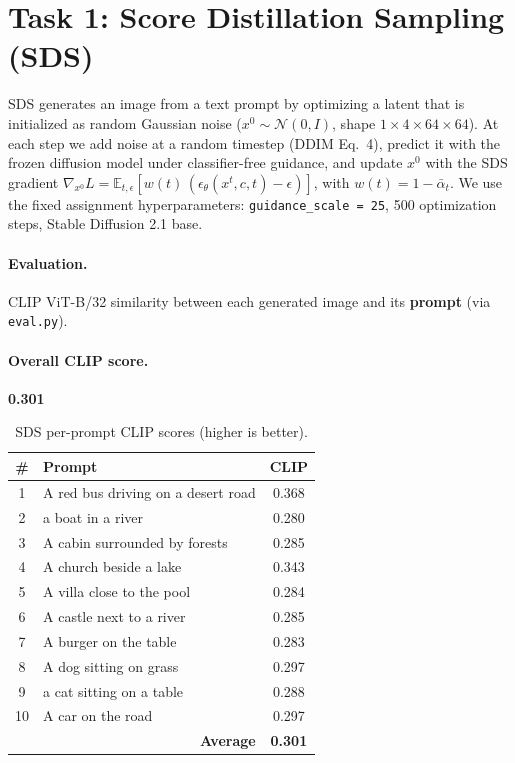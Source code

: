\documentclass[11pt,a4paper]{article}
\begin{document}
\section{Task 1: Score Distillation Sampling (SDS)}

SDS generates an image from a text prompt by optimizing a latent that is
initialized as random Gaussian noise ($x^0 \sim \mathcal{N}(0, I)$, shape
$1\times4\times64\times64$). At each step we add noise at a random timestep
(DDIM Eq.\ 4), predict it with the frozen diffusion model under classifier-free
guidance, and update $x^0$ with the SDS gradient
$\nabla_{x^0} L = \mathbb{E}_{t,\epsilon}\!\left[w(t)\,(\epsilon_\theta(x^t, c, t) - \epsilon)\right]$,
with $w(t) = 1 - \bar{\alpha}_t$. We use the fixed assignment hyperparameters:
\texttt{guidance\_scale = 25}, 500 optimization steps, Stable Diffusion 2.1 base.

\paragraph{Evaluation.} CLIP ViT-B/32 similarity between each generated image and
its \textbf{prompt} (via \texttt{eval.py}).

\paragraph{Overall CLIP score.} \textbf{0.301}

\begin{table}[H]
  \centering
  \caption{SDS per-prompt CLIP scores (higher is better).}
  \label{tab:sds-scores}
  \small
  \begin{tabular}{@{}clc@{}}
    \toprule
    \# & Prompt & CLIP \\
    \midrule
    1  & A red bus driving on a desert road & 0.368 \\
    2  & a boat in a river & 0.280 \\
    3  & A cabin surrounded by forests & 0.285 \\
    4  & A church beside a lake & 0.343 \\
    5  & A villa close to the pool & 0.284 \\
    6  & A castle next to a river & 0.285 \\
    7  & A burger on the table & 0.283 \\
    8  & A dog sitting on grass & 0.297 \\
    9  & a cat sitting on a table & 0.288 \\
    10 & A car on the road & 0.297 \\
    \midrule
    \multicolumn{2}{r}{\textbf{Average}} & \textbf{0.301} \\
    \bottomrule
  \end{tabular}
\end{table}
\end{document}
